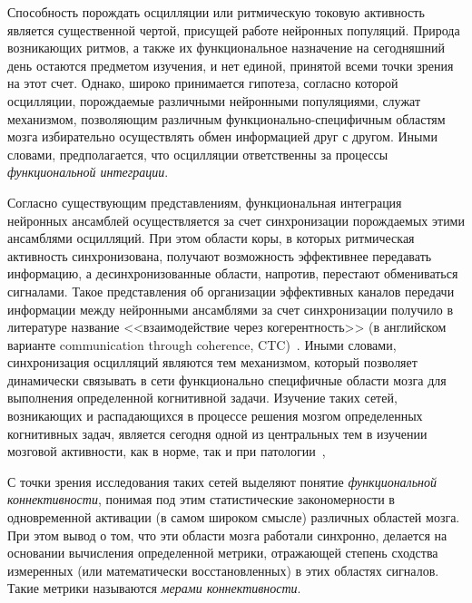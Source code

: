 
Способность порождать осцилляции или ритмическую токовую активность является
существенной чертой, присущей работе нейронных популяций. Природа возникающих
ритмов, а также их функциональное назначение на сегодняшний день остаются
предметом изучения, и нет единой, принятой всеми точки зрения на этот счет.
Однако, широко принимается гипотеза, согласно которой осцилляции, порождаемые
различными нейронными популяциями, служат механизмом, позволяющим различным
функционально-специфичным областям мозга избирательно осуществлять обмен
информацией друг с другом. Иными словами, предполагается, что осцилляции
ответственны за процессы \emph{функциональной интеграции}.

Согласно существующим представлениям, функциональная интеграция нейронных
ансамблей осуществляется за счет синхронизации порождаемых этими ансамблями
осцилляций. При этом области коры, в которых ритмическая активность
синхронизована, получают возможность эффективнее передавать информацию, а
десинхронизованные области, напротив, перестают обмениваться сигналами. Такое
представления об организации эффективных каналов передачи информации между
нейронными ансамблями за счет синхронизации получило в литературе название
<<взаимодействие через когерентность>> (в английском варианте communication
through coherence, CTC)~\cite{Fries2015}. Иными словами, синхронизация
осцилляций являются тем механизмом, который позволяет динамически связывать в
сети функционально специфичные области мозга для выполнения определенной
когнитивной задачи. Изучение таких сетей, возникающих и распадающихся в
процессе решения мозгом определенных когнитивных задач, является сегодня одной
из центральных тем в изучении мозговой активности, как в норме, так и при
патологии~\cite{varela, baker, ossadtchi, Bastin2017},~\cite{Alamian_front2017,
Alamian_clin2017}

С точки зрения исследования таких сетей выделяют понятие \emph{функциональной
коннективности}, понимая под этим статистические закономерности в одновременной
активации (в самом широком смысле) различных областей мозга.
При этом вывод о том, что эти области мозга работали синхронно, делается на
основании вычисления определенной метрики, отражающей степень сходства
измеренных (или математически восстановленных) в этих областях сигналов.  Такие
метрики называются \emph{мерами коннективности}.

